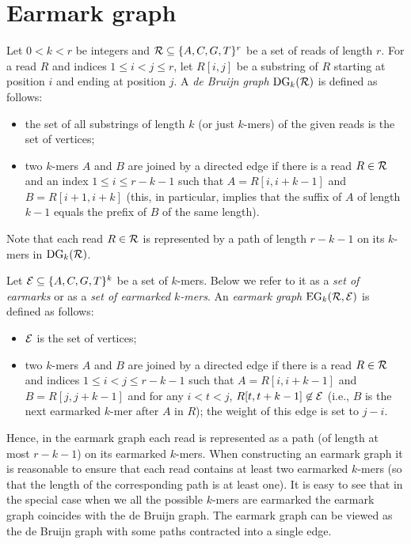 \documentclass[12pt]{article}
\begin{document}
\section{Earmark graph}

Let $0<k<r$ be integers and ${\cal R} \subseteq \{A,C,G,T\}^r$ be a set of reads
of length $r$. For a read $R$ and indices $1 \le i < j \le r$,
let $R[i,j]$ be a substring of $R$ starting at position $i$
and ending at position $j$.
A \emph{de Bruijn graph} $\textrm{DG}_k({\cal R})$ is defined as follows:
\begin{itemize}
\item the set of all substrings of length $k$ (or just $k$-mers) of the given reads is the 
set of vertices; 
\item two $k$-mers $A$ and $B$ are joined by a directed edge if there is a
read $R \in {\cal R}$ and an index $1 \le i \le r-k-1$ such that
$A=R[i,i+k-1]$ and $B=R[i+1,i+k]$
(this, in particular, implies that
the suffix of $A$ of length $k-1$ equals the prefix of $B$ of the same length).{}
\end{itemize}
Note that each read $R \in {\cal R}$ is represented by a path of length $r-k-1$
on its $k$-mers in $\textrm{DG}_k({\cal R})$.{}

Let ${\cal E} \subseteq \{A,C,G,T\}^k$ be a set of $k$-mers.
Below we refer to it as a \emph{set of earmarks} or as a \emph{set of earmarked $k$-mers}. 
An \emph{earmark graph} $\textrm{EG}_k({\cal R}, {\cal E})$ is defined as follows:
\begin{itemize}
\item ${\cal E}$ is the set of vertices;
\item two $k$-mers $A$ and $B$ are joined by a directed edge if there is a read $R \in {\cal R}$
and indices $1 \le i < j \le r-k-1$ such that
$A=R[i,i+k-1]$ and $B=R[j,j+k-1]$ and 
for any $i < t < j$, $R[t,t+k-1] \not \in {\cal E}$
(i.e., $B$ is the next earmarked $k$-mer after $A$ in $R$); the weight of this edge is set to
$j-i$.
\end{itemize}
Hence, in the earmark graph each read is represented as a path (of length at most $r-k-1$) on its earmarked $k$-mers.
When constructing an earmark graph it is reasonable to ensure that each read contains at least two 
earmarked $k$-mers (so that the length of the corresponding path is at least one).
It is easy to see that in the special case when we all the possible $k$-mers are earmarked
the earmark graph coincides with the de Bruijn graph. The earmark graph can be viewed as the de Bruijn graph
with some paths contracted into a single edge.
\end{document}
